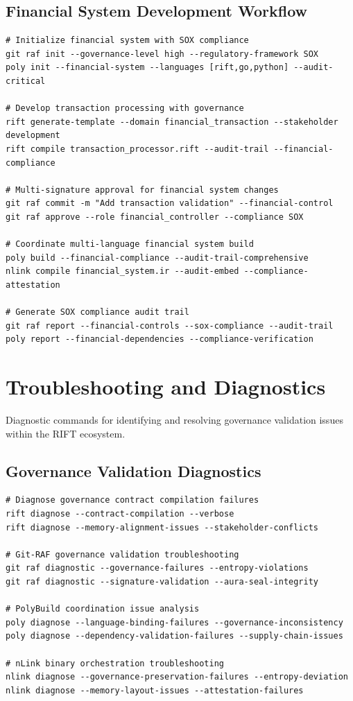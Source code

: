\documentclass[11pt,letterpaper]{article}
\begin{document}
\subsection{Financial System Development Workflow}

\begin{lstlisting}[language=shell, caption=Financial System Development Pipeline]
# Initialize financial system with SOX compliance
git raf init --governance-level high --regulatory-framework SOX
poly init --financial-system --languages [rift,go,python] --audit-critical

# Develop transaction processing with governance
rift generate-template --domain financial_transaction --stakeholder development
rift compile transaction_processor.rift --audit-trail --financial-compliance

# Multi-signature approval for financial system changes
git raf commit -m "Add transaction validation" --financial-control
git raf approve --role financial_controller --compliance SOX

# Coordinate multi-language financial system build
poly build --financial-compliance --audit-trail-comprehensive
nlink compile financial_system.ir --audit-embed --compliance-attestation

# Generate SOX compliance audit trail
git raf report --financial-controls --sox-compliance --audit-trail
poly report --financial-dependencies --compliance-verification
\end{lstlisting}

\section{Troubleshooting and Diagnostics}

Diagnostic commands for identifying and resolving governance validation issues within the RIFT ecosystem.

\subsection{Governance Validation Diagnostics}

\begin{lstlisting}[language=shell, caption=Diagnostic Commands]
# Diagnose governance contract compilation failures
rift diagnose --contract-compilation --verbose
rift diagnose --memory-alignment-issues --stakeholder-conflicts

# Git-RAF governance validation troubleshooting
git raf diagnostic --governance-failures --entropy-violations
git raf diagnostic --signature-validation --aura-seal-integrity

# PolyBuild coordination issue analysis
poly diagnose --language-binding-failures --governance-inconsistency
poly diagnose --dependency-validation-failures --supply-chain-issues

# nLink binary orchestration troubleshooting
nlink diagnose --governance-preservation-failures --entropy-deviation
nlink diagnose --memory-layout-issues --attestation-failures
\end{lstlisting}
\end{document}
